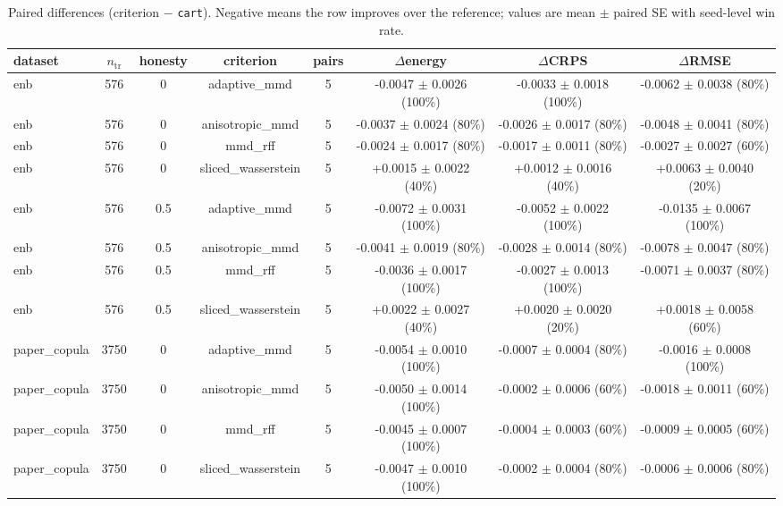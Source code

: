 \begin{table}[h]
  \centering
  \caption{Paired differences (criterion $-$ \texttt{cart}). Negative means the row improves over the reference; values are mean $\pm$ paired SE with seed-level win rate.}
  \label{tab:multivariate}
  \begin{adjustbox}{max width=\textwidth}
  \begin{tabular}{lccccccc}
    \toprule
    dataset & $n_{\mathrm{tr}}$ & honesty & criterion & pairs & $\Delta$energy & $\Delta$CRPS & $\Delta$RMSE \\
    \midrule
    enb & 576 & 0 & adaptive\_mmd & 5 & -0.0047 $\pm$ 0.0026 (100\%) & -0.0033 $\pm$ 0.0018 (100\%) & -0.0062 $\pm$ 0.0038 (80\%) \\
    enb & 576 & 0 & anisotropic\_mmd & 5 & -0.0037 $\pm$ 0.0024 (80\%) & -0.0026 $\pm$ 0.0017 (80\%) & -0.0048 $\pm$ 0.0041 (80\%) \\
    enb & 576 & 0 & mmd\_rff & 5 & -0.0024 $\pm$ 0.0017 (80\%) & -0.0017 $\pm$ 0.0011 (80\%) & -0.0027 $\pm$ 0.0027 (60\%) \\
    enb & 576 & 0 & sliced\_wasserstein & 5 & +0.0015 $\pm$ 0.0022 (40\%) & +0.0012 $\pm$ 0.0016 (40\%) & +0.0063 $\pm$ 0.0040 (20\%) \\
    enb & 576 & 0.5 & adaptive\_mmd & 5 & -0.0072 $\pm$ 0.0031 (100\%) & -0.0052 $\pm$ 0.0022 (100\%) & -0.0135 $\pm$ 0.0067 (100\%) \\
    enb & 576 & 0.5 & anisotropic\_mmd & 5 & -0.0041 $\pm$ 0.0019 (80\%) & -0.0028 $\pm$ 0.0014 (80\%) & -0.0078 $\pm$ 0.0047 (80\%) \\
    enb & 576 & 0.5 & mmd\_rff & 5 & -0.0036 $\pm$ 0.0017 (100\%) & -0.0027 $\pm$ 0.0013 (100\%) & -0.0071 $\pm$ 0.0037 (80\%) \\
    enb & 576 & 0.5 & sliced\_wasserstein & 5 & +0.0022 $\pm$ 0.0027 (40\%) & +0.0020 $\pm$ 0.0020 (20\%) & +0.0018 $\pm$ 0.0058 (60\%) \\
    paper\_copula & 3750 & 0 & adaptive\_mmd & 5 & -0.0054 $\pm$ 0.0010 (100\%) & -0.0007 $\pm$ 0.0004 (80\%) & -0.0016 $\pm$ 0.0008 (100\%) \\
    paper\_copula & 3750 & 0 & anisotropic\_mmd & 5 & -0.0050 $\pm$ 0.0014 (100\%) & -0.0002 $\pm$ 0.0006 (60\%) & -0.0018 $\pm$ 0.0011 (60\%) \\
    paper\_copula & 3750 & 0 & mmd\_rff & 5 & -0.0045 $\pm$ 0.0007 (100\%) & -0.0004 $\pm$ 0.0003 (60\%) & -0.0009 $\pm$ 0.0005 (60\%) \\
    paper\_copula & 3750 & 0 & sliced\_wasserstein & 5 & -0.0047 $\pm$ 0.0010 (100\%) & -0.0002 $\pm$ 0.0004 (80\%) & -0.0006 $\pm$ 0.0006 (80\%) \\

\end{tabular}
\end{adjustbox}
\end{table}
